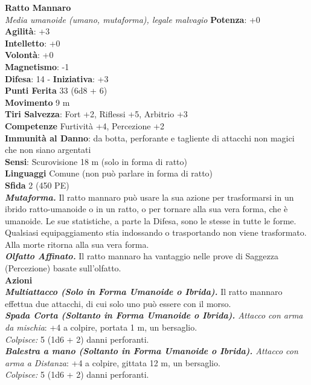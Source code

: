 \begin{multicols}{2}
\medskip\textbf{Ratto Mannaro}\\
\emph{Media umanoide (umano, mutaforma), legale malvagio}
\textbf{Potenza}: +0\\
\textbf{Agilità}: +3\\
\textbf{Intelletto}: +0\\
\textbf{Volontà}: +0\\
\textbf{Magnetismo}: -1\\
\textbf{Difesa}: 14 - \textbf{Iniziativa}: +3\\
\textbf{Punti Ferita} 33 (6d8 + 6)\\
\textbf{Movimento} 9 m\\
\textbf{Tiri Salvezza}: Fort +2, Riflessi +5, Arbitrio +3\\
\textbf{Competenze} Furtività +4, Percezione +2\\
\textbf{Immunità al Danno}: da botta, perforante e tagliente di attacchi non magici che non siano argentati\\
\textbf{Sensi}: Scurovisione 18 m (solo in forma di ratto)\\
\textbf{Linguaggi} Comune (non può parlare in forma di ratto)\\
\textbf{Sfida} 2 (450 PE)\smallskip\\
\emph{\textbf{Mutaforma.}} Il ratto mannaro può usare la sua azione per trasformarsi in un ibrido ratto-umanoide o in un ratto, o per tornare alla sua vera forma, che è umanoide. Le sue statistiche, a parte la Difesa, sono le stesse in tutte le forme. Qualsiasi equipaggiamento stia indossando o trasportando non viene trasformato. Alla morte ritorna alla sua vera forma.\\
\emph{\textbf{Olfatto Affinato.}} Il ratto mannaro ha vantaggio nelle prove di Saggezza (Percezione) basate sull'olfatto.\\
\smallskip\textbf{Azioni}\\

\emph{\textbf{Multiattacco (Solo in Forma Umanoide o Ibrida).}} Il ratto mannaro effettua due attacchi, di cui solo uno può essere con il morso.\\
\emph{\textbf{Spada Corta (Soltanto in Forma Umanoide o Ibrida).} Attacco con arma da mischia}: +4 a colpire, portata 1 m, un bersaglio.\\
\emph{Colpisce:} 5 (1d6 + 2) danni perforanti.\\

\emph{\textbf{Balestra a mano (Soltanto in Forma Umanoide o Ibrida).} Attacco con arma a Distanza}: +4 a colpire, gittata 12 m, un bersaglio.\\
\emph{Colpisce:} 5 (1d6 + 2) danni perforanti.\\


\end{multicols}

